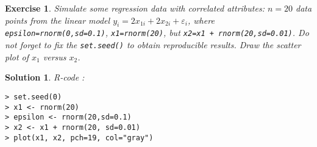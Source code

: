 \documentclass[12pt,a4paper]{article}
\newtheorem{exercise}{Exercise}
\newtheorem{solution}{Solution}
\begin{document}
\begin{exercise}
Simulate some regression data with correlated attributes: $n=20$ data points from the linear model  $y_i=2x_{1i}+2x_{2i}+\varepsilon_i$, where \texttt{epsilon=rnorm(0,sd=0.1)},  \texttt{x1=rnorm(20)}, but \texttt{x2=x1 + rnorm(20,sd=0.01)}. Do not forget to fix the \texttt{set.seed()} to obtain reproducible results.  Draw the scatter plot of $x_1$ versus $x_2$.
\end{exercise}

\begin{solution}
R-code : 
\begin{verbatim}
> set.seed(0)
> x1 <- rnorm(20)
> epsilon <- rnorm(20,sd=0.1)
> x2 <- x1 + rnorm(20, sd=0.01)
> plot(x1, x2, pch=19, col="gray")
\end{verbatim}
\end{solution}
\end{document}
